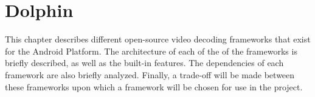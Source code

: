 \section{Dolphin}
This chapter describes different open-source video decoding frameworks that exist for the Android Platform. The architecture of each of the  of the frameworks is briefly described, as well as the built-in features. The dependencies of each framework are also briefly analyzed. Finally, a trade-off will be made between these frameworks upon which a framework will be chosen for use in the project.